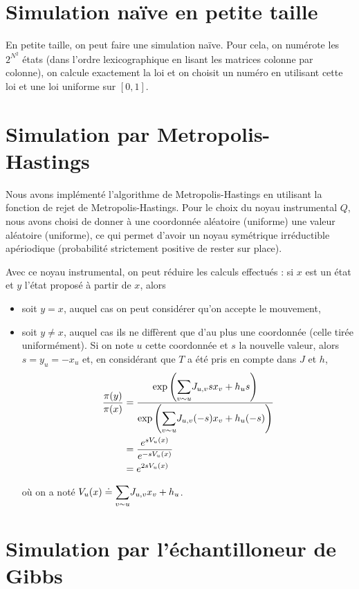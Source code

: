 \documentclass[a4paper,11pt]{article}
\begin{document}
\section{Simulation naïve en petite taille}

En petite taille, on peut faire une simulation naïve. Pour cela, on numérote les $2^{N^2}$ états (dans l'ordre lexicographique en lisant les matrices colonne par colonne), on calcule exactement la loi et on choisit un numéro en utilisant cette loi et une loi uniforme sur $[0,1]$.

\section{Simulation par Metropolis-Hastings}\label{sec:MH}

Nous avons implémenté l'algorithme de Metropolis-Hastings en utilisant la fonction de rejet de Metropolis-Hastings. Pour le choix du noyau instrumental $Q$, nous avons choisi de donner à une coordonnée aléatoire (uniforme) une valeur aléatoire (uniforme), ce qui permet d'avoir un noyau symétrique irréductible apériodique (probabilité strictement positive de rester sur place).

Avec ce noyau instrumental, on peut réduire les calculs effectués : si $x$ est un état et $y$ l'état proposé à partir de $x$, alors
\begin{itemize}
	\item soit $y = x$, auquel cas on peut considérer qu'on accepte le mouvement,
	\item soit $y \neq x$, auquel cas ils ne diffèrent que d'au plus une coordonnée (celle tirée uniformément). Si on note $u$ cette coordonnée et $s$ la nouvelle valeur, alors $s = y_u = - x_u$ et, en considérant que $T$ a été pris en compte dans $J$ et $h$,
	\begin{align*}
	\frac{\pi(y)}{\pi(x)}
	&= \frac{\exp \left( \displaystyle{\sum_{v \sim u}^{}} J_{u,v} s x_{v} + h_{u} s \right)}{\exp \left( \displaystyle{\sum_{v \sim u}^{}} J_{u,v} (-s) x_{v} + h_{u} (-s) \right)}\\
	&= \frac{e^{s V_u(x)}}{e^{-s V_u(x)}}\\
	&= e^{2 s V_u(x)}
	\end{align*}
	où on a noté $V_u(x) \doteq \displaystyle{\sum_{v \sim u}^{}} J_{u,v} x_v + h_u$.
\end{itemize}

\section{Simulation par l'échantilloneur de Gibbs}
\end{document}
